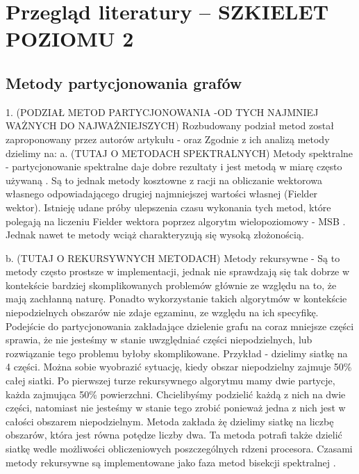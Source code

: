 \newpage


\section{Przegląd literatury -- SZKIELET POZIOMU 2}
\label{sec:literature}

\subsection{Metody partycjonowania grafów}

1. (PODZIAŁ METOD PARTYCJONOWANIA -OD TYCH NAJMNIEJ WAŻNYCH DO NAJWAŻNIEJSZYCH) Rozbudowany podział metod został zaproponowany przez autorów artykułu - \cite{metis}
oraz \cite{1364754}
Zgodnie z ich analizą metody dzielimy na:
\newline\newline
a. (TUTAJ O METODACH SPEKTRALNYCH) Metody spektralne - partycjonowanie spektralne daje dobre rezultaty i jest metodą w miarę często używaną
\cite{10.1137/0611030, 10.5555/147877.147902, improved_spectral}. Są to jednak metody kosztowne z racji na
obliczanie wektorowa własnego odpowiadającego drugiej najmniejszej wartości własnej (Fielder wektor).
Istnieję udane próby ulepszenia czasu wykonania tych metod, które polegają na liczeniu Fielder wektora poprzez
algorytm wielopoziomowy - MSB \cite{fast_multilevel}. Jednak nawet te metody wciąż charakteryzują się wysoką złożonością.

b. (TUTAJ O REKURSYWNYCH METODACH) Metody rekursywne -
Są to metody często prostsze w implementacji, jednak nie sprawdzają się tak dobrze w kontekście bardziej
skomplikowanych problemów głównie ze względu na to, że mają zachłanną naturę.
Ponadto wykorzystanie takich algorytmów w kontekście niepodzielnych obszarów nie zdaje egzaminu,
ze względu na ich specyfikę. Podejście do partycjonowania zakładające dzielenie grafu na coraz mniejsze
części sprawia, że nie jesteśmy w stanie uwzględniać części niepodzielnych, lub rozwiązanie tego problemu byłoby skomplikowane.
Przykład - dzielimy siatkę na 4 części. Można sobie wyobrazić sytuację, kiedy obszar niepodzielny zajmuje 50\% całej siatki.
Po pierwszej turze rekursywnego algorytmu mamy dwie partycje, każda zajmująca 50\% powierzchni. Chcielibyśmy podzielić
każdą z nich na dwie części, natomiast nie jesteśmy w stanie tego zrobić ponieważ jedna z nich jest w całości obszarem
niepodzielnym.
Metoda \cite{recursive} zakłada żę dzielimy siatkę na liczbę obszarów,
która jest równa potędze liczby dwa. Ta metoda potrafi także dzielić siatkę wedle możliwości obliczeniowych
poszczególnych rdzeni procesora. Czasami metody rekursywne są implementowane jako faza metod
bisekcji spektralnej \cite{10.1137/0611030}.


